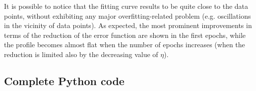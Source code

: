 \documentclass[letterpaper,headings=standardclasses]{scrartcl}
\begin{document}
It is possible to notice that the fitting curve results to be quite close to the data points, without exhibiting any major overfitting-related problem (e.g. oscillations in the vicinity of data points). As expected, the most prominent improvements in terms of the reduction of the error function are shown in the first epochs, while the profile becomes almost flat when the number of epochs increases (when the reduction is limited also by the decreasing value of $\eta$).

\subsection{Complete Python code}


\end{document}
